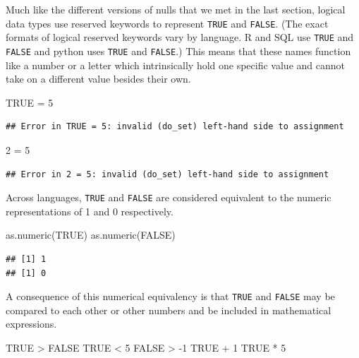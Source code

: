 \documentclass[
]{krantz}
\makeatletter
\newenvironment{Shaded}{\begin{snugshade}}{\end{snugshade}}
\newcommand{\ConstantTok}[1]{\textcolor[rgb]{0,0,0}{#1}}
\newcommand{\DecValTok}[1]{\textcolor[rgb]{0.06,0.06,0.06}{#1}}
\newcommand{\FunctionTok}[1]{\textcolor[rgb]{0,0,0}{#1}}
\newcommand{\NormalTok}[1]{#1}
\newcommand{\OtherTok}[1]{\textcolor[rgb]{0.37,0.37,0.37}{#1}}
\newcommand{\SpecialCharTok}[1]{\textcolor[rgb]{0,0,0}{#1}}
\newenvironment{kframe}{%
\medskip{}
\setlength{\fboxsep}{.8em}
 \def\at@end@of@kframe{}%
 \ifinner\ifhmode%
  \def\at@end@of@kframe{\end{minipage}}%
  \begin{minipage}{\columnwidth}%
 \fi\fi%
 \def\FrameCommand##1{\hskip\@totalleftmargin \hskip-\fboxsep
 \colorbox{shadecolor}{##1}\hskip-\fboxsep
     \hskip-\linewidth \hskip-\@totalleftmargin \hskip\columnwidth}%
 \MakeFramed {\advance\hsize-\width
   \@totalleftmargin\z@ \linewidth\hsize
   \@setminipage}}%
 {\par\unskip\endMakeFramed%
 \at@end@of@kframe}
\renewenvironment{Shaded}{\begin{kframe}}{\end{kframe}}
\makeatother
\begin{document}
Much like the different versions of nulls that we met in the last section, logical data types use reserved keywords to represent \texttt{TRUE} and \texttt{FALSE}.
(The exact formats of logical reserved keywords vary by language. R and SQL use \texttt{TRUE} and \texttt{FALSE} and python uses \texttt{TRUE} and \texttt{FALSE}.)
This means that these names function like a number or a letter which intrinsically hold one specific value and cannot take on a different value besides their own.

\begin{Shaded}
\begin{Highlighting}[]
\ConstantTok{TRUE} \OtherTok{=} \DecValTok{5}
\end{Highlighting}
\end{Shaded}

\begin{verbatim}
## Error in TRUE = 5: invalid (do_set) left-hand side to assignment
\end{verbatim}

\begin{Shaded}
\begin{Highlighting}[]
\DecValTok{2} \OtherTok{=} \DecValTok{5}
\end{Highlighting}
\end{Shaded}

\begin{verbatim}
## Error in 2 = 5: invalid (do_set) left-hand side to assignment
\end{verbatim}

Across languages, \texttt{TRUE} and \texttt{FALSE} are considered equivalent to the numeric representations of 1 and 0 respectively.

\begin{Shaded}
\begin{Highlighting}[]
\FunctionTok{as.numeric}\NormalTok{(}\ConstantTok{TRUE}\NormalTok{)}
\FunctionTok{as.numeric}\NormalTok{(}\ConstantTok{FALSE}\NormalTok{)}
\end{Highlighting}
\end{Shaded}

\begin{verbatim}
## [1] 1
## [1] 0
\end{verbatim}

A consequence of this numerical equivalency is that \texttt{TRUE} and \texttt{FALSE} may be compared to each other or other numbers and be included in mathematical expressions.

\begin{Shaded}
\begin{Highlighting}[]
\ConstantTok{TRUE} \SpecialCharTok{\textgreater{}} \ConstantTok{FALSE}
\ConstantTok{TRUE} \SpecialCharTok{\textless{}} \DecValTok{5}
\ConstantTok{FALSE} \SpecialCharTok{\textgreater{}} \SpecialCharTok{{-}}\DecValTok{1}
\ConstantTok{TRUE} \SpecialCharTok{+} \DecValTok{1}
\ConstantTok{TRUE} \SpecialCharTok{*} \DecValTok{5}
\end{Highlighting}
\end{Shaded}
\end{document}
